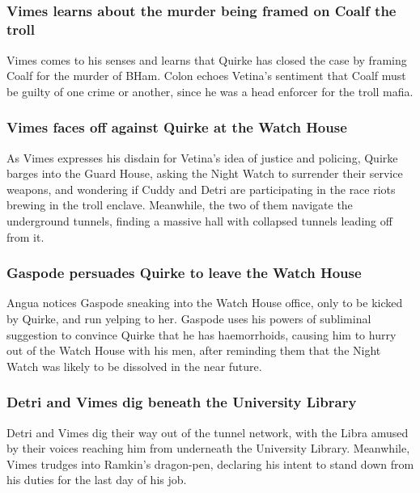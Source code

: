 \subsection{}
\subsubsection{\Gls{Vimes} learns about the murder being framed on \Gls{Coalf} the troll}
\Gls{Vimes} comes to his senses and learns that \Gls{Quirke} has closed the case by framing
\Gls{Coalf} for the murder of \Gls{BHam}. \Gls{Colon} echoes \Gls{Vetina}'s sentiment that
\Gls{Coalf} must be guilty of one crime or another, since he was a head enforcer for the troll
mafia.

\subsubsection{\Gls{Vimes} faces off against \Gls{Quirke} at the Watch House}
As \Gls{Vimes} expresses his disdain for \Gls{Vetina}'s idea of justice and policing, \Gls{Quirke}
barges into the Guard House, asking the Night Watch to surrender their service weapons, and
wondering if \Gls{Cuddy} and \Gls{Detri} are participating in the race riots brewing in the troll
enclave. Meanwhile, the two of them navigate the underground tunnels, finding a massive hall with
collapsed tunnels leading off from it.

\subsubsection{\Gls{Gaspode} persuades \Gls{Quirke} to leave the Watch House}
\Gls{Angua} notices \Gls{Gaspode} sneaking into the Watch House office, only to be kicked by
\Gls{Quirke}, and run yelping to her. \Gls{Gaspode} uses his powers of subliminal suggestion to
convince \Gls{Quirke} that he has haemorrhoids, causing him to hurry out of the Watch House with his
men, after reminding them that the Night Watch was likely to be dissolved in the near future.

\subsubsection{\Gls{Detri} and \Gls{Vimes} dig beneath the University Library}
\Gls{Detri} and \Gls{Vimes} dig their way out of the tunnel network, with the \Gls{Libra} amused
by their voices reaching him from underneath the University Library. Meanwhile, \Gls{Vimes} trudges
into \Gls{Ramkin}'s dragon-pen, declaring his intent to stand down from his duties for the last day
of his job.

